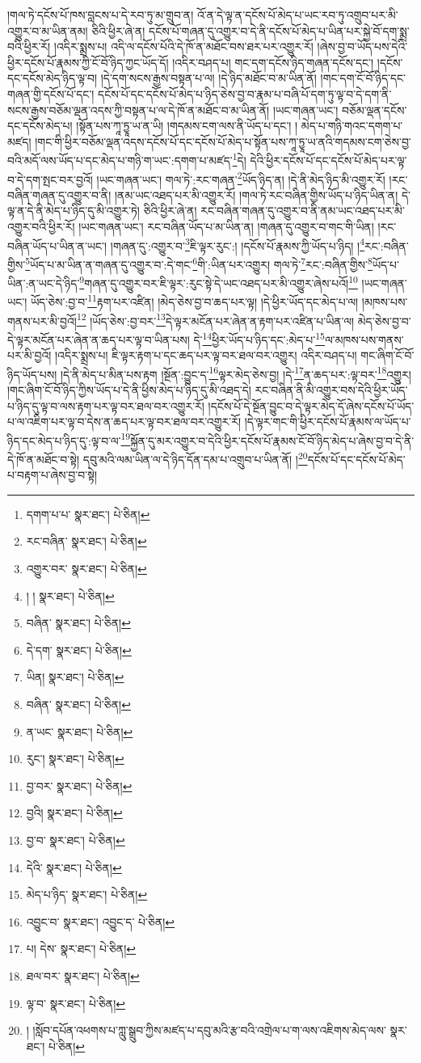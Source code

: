 །གལ་ཏེ་དངོས་པོ་ཁས་བླངས་པ་དེ་རབ་ཏུ་མ་གྲུབ་ན། འོ་ན་དེ་ལྟ་ན་དངོས་པོ་མེད་པ་ཡང་རབ་ཏུ་འགྲུབ་པར་མི་འགྱུར་བ་མ་ཡིན་ནམ། ཅིའི་ཕྱིར་ཞེ་ན། དངོས་པོ་གཞན་དུ་འགྱུར་བ་དེ་ནི་དངོས་པོ་མེད་པ་ཡིན་པར་སྐྱེ་བོ་དག་སྨྲ་བའི་ཕྱིར་རོ། །འདིར་སྨྲས་པ། འདི་ལ་དངོས་པོའི་དེ་ཁོ་ན་མཐོང་བས་ཐར་པར་འགྱུར་རོ། །ཞེས་བྱ་བ་ཡོད་པས་དེའི་ཕྱིར་དངོས་པོ་རྣམས་ཀྱི་ངོ་བོ་ཉིད་ཀྱང་ཡོད་དོ། །འདིར་བཤད་པ། གང་དག་དངོས་ཉིད་གཞན་དངོས་དང་། །དངོས་དང་དངོས་མེད་ཉིད་ལྟ་བ། །དེ་དག་སངས་རྒྱས་བསྟན་པ་ལ། །དེ་ཉིད་མཐོང་བ་མ་ཡིན་ནོ། །གང་དག་ངོ་བོ་ཉིད་དང་གཞན་གྱི་དངོས་པོ་དང་། དངོས་པོ་དང་དངོས་པོ་མེད་པ་ཉིད་ཅེས་བྱ་བ་རྣམ་པ་བཞི་པོ་དག་ཏུ་ལྟ་བ་དེ་དག་ནི་སངས་རྒྱས་བཅོམ་ལྡན་འདས་ཀྱི་བསྟན་པ་ལ་དེ་ཁོ་ན་མཐོང་བ་མ་ཡིན་ནོ། །ཡང་གཞན་ཡང་། བཅོམ་ལྡན་དངོས་དང་དངོས་མེད་པ། །སྟོན་པས་ཀཱ་ཏྱཱ་ཡ་ན་ཡི། །གདམས་ངག་ལས་ནི་ཡོད་པ་དང་། །
མེད་པ་གཉི་གའང་དགག་པ་མཛད། །གང་གི་ཕྱིར་བཅོམ་ལྡན་འདས་དངོས་པོ་དང་དངོས་པོ་མེད་པ་སྟོན་པས་ཀཱ་ཏྱཱ་ཡ་ནའི་གདམས་ངག་ཅེས་བྱ་བའི་མདོ་ལས་ཡོད་པ་དང་མེད་པ་གཉི་ག་ཡང་:དགག་པ་མཛད་\footnote{དགག་པ་པ་  སྣར་ཐང་།  པེ་ཅིན། }དེ། དེའི་ཕྱིར་དངོས་པོ་དང་དངོས་པོ་མེད་པར་ལྟ་བ་དེ་དག་སྤང་བར་བྱའོ། །ཡང་གཞན་ཡང་། གལ་ཏེ་:རང་གཞན་\footnote{རང་བཞིན་  སྣར་ཐང་།  པེ་ཅིན། }ཡོད་ཉིད་ན། །དེ་ནི་མེད་ཉིད་མི་འགྱུར་རོ། །རང་བཞིན་གཞན་དུ་འགྱུར་བ་ནི། །ནམ་ཡང་འཐད་པར་མི་འགྱུར་རོ། །གལ་ཏེ་རང་བཞིན་གྱིས་ཡོད་པ་ཉིད་ཡིན་ན། དེ་ལྟ་ན་དེ་ནི་མེད་པ་ཉིད་དུ་མི་འགྱུར་ཏེ། ཅིའི་ཕྱིར་ཞེ་ན། རང་བཞིན་གཞན་དུ་འགྱུར་བ་ནི་ནམ་ཡང་འཐད་པར་མི་འགྱུར་བའི་ཕྱིར་རོ། །ཡང་གཞན་ཡང་། རང་བཞིན་ཡོད་པ་མ་ཡིན་ན། །གཞན་དུ་འགྱུར་བ་གང་གི་ཡིན། །རང་བཞིན་ཡོད་པ་ཡིན་ན་ཡང་། །གཞན་དུ་:འགྱུར་བ་\footnote{འགྱུར་བར་  སྣར་ཐང་།  པེ་ཅིན། }ཇི་ལྟར་རུང་:། །དངོས་པོ་རྣམས་ཀྱི་ཡོད་པ་ཉིད། །\footnote{། །  སྣར་ཐང་།  པེ་ཅིན། }རང་:བཞིན་གྱིས་\footnote{བཞིན་  སྣར་ཐང་།  པེ་ཅིན། }ཡོད་པ་མ་ཡིན་ན་གཞན་དུ་འགྱུར་བ་:དེ་གང་\footnote{དེ་དག་  སྣར་ཐང་།  པེ་ཅིན། }གི་:ཡིན་པར་འགྱུར། གལ་ཏེ་\footnote{ཡིན།   སྣར་ཐང་།  པེ་ཅིན། }རང་:བཞིན་གྱིས་\footnote{བཞིན་  སྣར་ཐང་།  པེ་ཅིན། }ཡོད་པ་ཡིན་:ན་ཡང་དེ་ཉིད་\footnote{ན་ཡང་  སྣར་ཐང་།  པེ་ཅིན། }གཞན་དུ་འགྱུར་བར་ཇི་ལྟར་:རུང་སྟེ་དེ་ཡང་འཐད་པར་མི་འགྱུར་ཞེས་པའོ།\footnote{རུང་།  སྣར་ཐང་།  པེ་ཅིན། } །ཡང་གཞན་ཡང་། ཡོད་ཅེས་:བྱ་བ་\footnote{བྱ་བར་  སྣར་ཐང་།  པེ་ཅིན། }རྟག་པར་འཛིན། །མེད་ཅེས་བྱ་བ་ཆད་པར་ལྟ། །དེ་ཕྱིར་ཡོད་དང་མེད་པ་ལ། །མཁས་པས་གནས་པར་མི་བྱའོ།\footnote{བྱའི།  སྣར་ཐང་།  པེ་ཅིན། } །ཡོད་ཅེས་:བྱ་བར་\footnote{བྱ་བ་  སྣར་ཐང་།  པེ་ཅིན། }དེ་ལྟར་མངོན་པར་ཞེན་ན་རྟག་པར་འཛིན་པ་ཡིན་ལ། མེད་ཅེས་བྱ་བ་དེ་ལྟར་མངོན་པར་ཞེན་ན་ཆད་པར་ལྟ་བ་ཡིན་པས། དེ་\footnote{དེའི་  སྣར་ཐང་།  པེ་ཅིན། }ཕྱིར་ཡོད་པ་ཉིད་དང་:མེད་པ་\footnote{མེད་པ་ཉིད་  སྣར་ཐང་།  པེ་ཅིན། }ལ་མཁས་པས་གནས་པར་མི་བྱའོ། །འདིར་སྨྲས་པ། ཇི་ལྟར་རྟག་པ་དང་ཆད་པར་ལྟ་བར་ཐལ་བར་འགྱུར། འདིར་བཤད་པ། གང་ཞིག་ངོ་བོ་ཉིད་ཡོད་པས། །དེ་ནི་མེད་པ་མིན་པས་རྟག །སྔོན་:བྱུང་ད་\footnote{འབྱུང་བ་  སྣར་ཐང་། འབྱུང་ད་  པེ་ཅིན། }ལྟར་མེད་ཅེས་བྱ། །དེ་\footnote{པ། དེས་  སྣར་ཐང་།  པེ་ཅིན། }ན་ཆད་པར་:ལྟ་བར་\footnote{ཐལ་བར་  སྣར་ཐང་།  པེ་ཅིན། }འགྱུར། །གང་ཞིག་ངོ་བོ་ཉིད་ཀྱིས་ཡོད་པ་དེ་ནི་ཕྱིས་མེད་པ་ཉིད་དུ་མི་འཐད་དེ། རང་བཞིན་ནི་མི་འགྱུར་བས་དེའི་ཕྱིར་ཡོད་པ་ཉིད་དུ་ལྟ་བ་ལས་རྟག་པར་ལྟ་བར་ཐལ་བར་འགྱུར་རོ། །དངོས་པོ་དེ་སྔོན་བྱུང་བ་དེ་ལྟར་མེད་དོ་ཞེས་དངོས་པོ་ཡོད་པ་ལ་འཇིག་པར་ལྟ་བ་དེས་ན་ཆད་པར་ལྟ་བར་ཐལ་བར་འགྱུར་རོ། །དེ་ལྟར་གང་གི་ཕྱིར་དངོས་པོ་རྣམས་ལ་ཡོད་པ་ཉིད་དང་མེད་པ་ཉིད་དུ་:ལྟ་བ་ལ་\footnote{ལྟ་བ་  སྣར་ཐང་།  པེ་ཅིན། }སྐྱོན་དུ་མར་འགྱུར་བ་དེའི་ཕྱིར་དངོས་པོ་རྣམས་ངོ་བོ་ཉིད་མེད་པ་ཞེས་བྱ་བ་དེ་ནི་དེ་ཁོ་ན་མཐོང་བ་སྟེ། དབུ་མའི་ལམ་ཡིན་ལ་དེ་ཉིད་དོན་དམ་པ་འགྲུབ་པ་ཡིན་ནོ། །\footnote{། །སློབ་དཔོན་འཕགས་པ་ཀླུ་སྒྲུབ་ཀྱིས་མཛད་པ་དབུ་མའི་རྩ་བའི་འགྲེལ་པ་ག་ལས་འཇིགས་མེད་ལས་  སྣར་ཐང་།  པེ་ཅིན། }དངོས་པོ་དང་དངོས་པོ་མེད་པ་བརྟག་པ་ཞེས་བྱ་བ་སྟེ། 